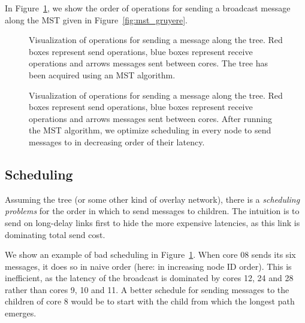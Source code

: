 \documentclass{article}
\begin{document}
In Figure~\ref{fig:mst_gruyere_operations}, we show the order of
operations for sending a broadcast message along the MST given in
Figure~\ref{fig:mst_gruyere}. 

\begin{figure}[htb]
  \centering
  \begin{tikzpicture}[scale=.35,transform shape]
    
  \end{tikzpicture}
  \caption{Visualization of operations for sending a message along the
    tree. Red boxes represent send operations, blue boxes represent
    receive operations and arrows messages sent between cores. The
    tree has been acquired using an MST algorithm.}
  \label{fig:mst_gruyere_operations}
\end{figure}

\begin{figure}[htb]
  \centering
  \begin{tikzpicture}[scale=.35,transform shape]
    
  \end{tikzpicture}
  \caption{Visualization of operations for sending a message along the
    tree. Red boxes represent send operations, blue boxes represent
    receive operations and arrows messages sent between cores. After
    running the MST algorithm, we optimize scheduling in every node to
    send messages to in decreasing order of their latency.}
  \label{fig:mst_gruyere_operations_sorted}
\end{figure}

\subsection{Scheduling}

Assuming the tree (or some other kind of overlay network), there is a
\emph{scheduling problems} for the order in which to send messages to
children. The intuition is to send on long-delay links first to hide
the more expensive latencies, as this link is dominating total send
cost.

We show an example of bad scheduling in
Figure~\ref{fig:mst_gruyere_operations}. When core 08 sends its six
messages, it does so in naive order (here: in increasing node ID
order). This is inefficient, as the latency of the broadcast is
dominated by cores 12, 24 and 28 rather than cores 9, 10 and 11. A
better schedule for sending messages to the children of core 8 would
be to start with the child from which the longest path emerges.
\end{document}
